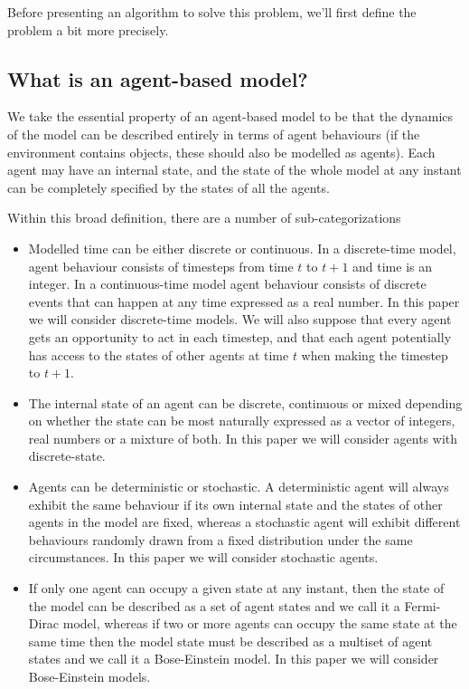 \documentclass{article}
\begin{document}
Before presenting an algorithm to solve this problem, we'll first define the problem a bit more precisely.

\subsection{What is an agent-based model?}

We take the essential property of an agent-based model to be that the dynamics of the model can be described entirely in terms of agent behaviours (if the environment contains objects, these should also be modelled as agents). Each agent may have an internal state, and the state of the whole model at any instant can be completely specified by the states of all the agents.

Within this broad definition, there are a number of sub-categorizations
\begin{itemize}

\item Modelled time can be either discrete or continuous. In a discrete-time model, agent behaviour consists of timesteps from time $t$ to $t+1$ and time is an integer. In a continuous-time model agent behaviour consists of discrete events that can happen at any time expressed as a real number. In this paper we will consider discrete-time models. We will also suppose that every agent gets an opportunity to act in each timestep, and that each agent potentially has access to the states of other agents at time $t$ when making the timestep to $t+1$.

\item The internal state of an agent can be discrete, continuous or mixed depending on whether the state can be most naturally expressed as a vector of integers, real numbers or a mixture of both. In this paper we will consider agents with discrete-state. 

\item Agents can be deterministic or stochastic. A deterministic agent will always exhibit the same behaviour if its own internal state and the states of other agents in the model are fixed, whereas a stochastic agent will exhibit different behaviours randomly drawn from a fixed distribution under the same circumstances. In this paper we will consider stochastic agents.

\item If only one agent can occupy a given state at any instant, then the state of the model can be described as a set of agent states and we call it a Fermi-Dirac model, whereas if two or more agents can occupy the same state at the same time then the model state must be described as a multiset\cite{blizard1988multiset} of agent states and we call it a Bose-Einstein model. In this paper we will consider Bose-Einstein models.

\end{itemize}
\end{document}
